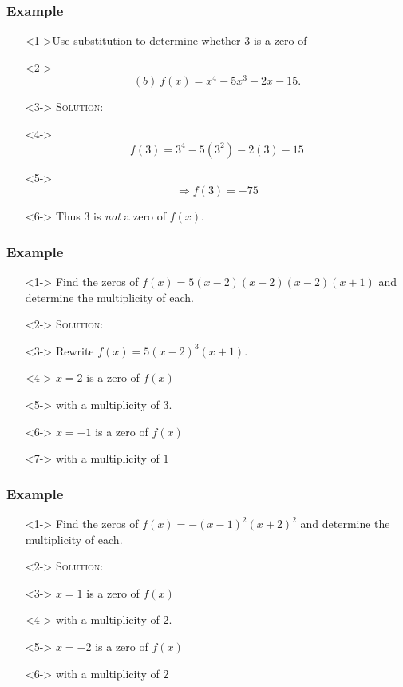 \documentclass{beamer}
\begin{document}
\begin{frame}
  \frametitle{Example}
    \begin{enumerate}
      \item[]<1->Use substitution to determine whether $3$ is a zero of
      \item[]<2-> \[ (b)~f(x)=x^{4}-5x^{3}-2x-15. \]
      \item[]<3-> \textsc{Solution:}
      \item[]<4-> \[ f(3)=3^{4}-5(3^{2})-2(3)-15 \]
      \item[]<5-> \[ \Rightarrow f(3)=-75 \]
      \item[]<6-> Thus $3$ is \emph{not} a zero of $f(x)$.
    \end{enumerate}
\end{frame}

\begin{frame}
  \frametitle{Example}
    \begin{enumerate}
      \item[]<1-> Find the zeros of $f(x)=5(x-2)(x-2)(x-2)(x+1)$ and determine the multiplicity of each.
      \item[]<2-> \textsc{Solution:}
      \item[]<3-> Rewrite $f(x)=5(x-2)^{3}(x+1)$.
      \item[]<4-> $x=2$ is a zero of $f(x)$
      \item[]<5-> with a multiplicity of $3$.
      \item[]<6-> $x=-1$ is a zero of $f(x)$
      \item[]<7-> with a multiplicity of $1$
    \end{enumerate}
\end{frame}

\begin{frame}
  \frametitle{Example}
    \begin{enumerate}
      \item[]<1-> Find the zeros of $f(x)=-(x-1)^{2}(x+2)^{2}$ and determine the multiplicity of each.
      \item[]<2-> \textsc{Solution:}
      \item[]<3-> $x=1$ is a zero of $f(x)$
      \item[]<4-> with a multiplicity of $2$.
      \item[]<5-> $x=-2$ is a zero of $f(x)$
      \item[]<6-> with a multiplicity of $2$
    \end{enumerate}
\end{frame}
\end{document}
